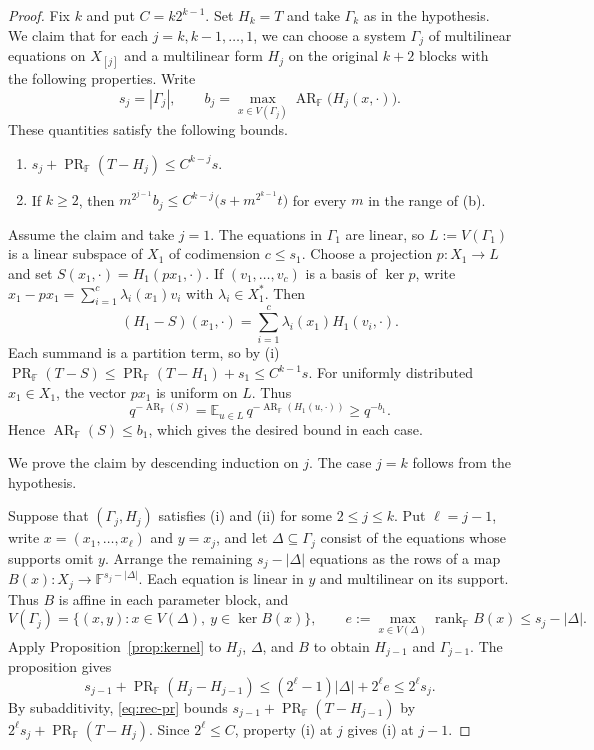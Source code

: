 \documentclass[11pt,reqno]{amsart}
\theoremstyle{plain}
\theoremstyle{definition}
\newcommand{\F}{\mathbb F}
\newcommand{\E}{\mathbb E}
\DeclareMathOperator{\arank}{AR}
\DeclareMathOperator{\prank}{PR}
\DeclareMathOperator{\rk}{rank}
\begin{document}
\begin{proof}
Fix $k$ and put $C=k2^{k-1}$. Set $H_k=T$ and take $\Gamma_k$ as in
the hypothesis. We claim that for each $j=k,k-1,\ldots,1$, we can choose a system
$\Gamma_j$ of multilinear equations on $X_{[j]}$ and a multilinear
form $H_j$ on the original $k+2$ blocks with the following properties.
Write
\[
 s_j=|\Gamma_j|,\qquad
 b_j=\max_{x\in V(\Gamma_j)}\arank_{\F}\bigl(H_j(x,\cdot)\bigr).
\]
These quantities satisfy the following bounds.
\begin{enumerate}
\item[\textup{(i)}] $s_j+\prank_{\F}(T-H_j)\leq C^{k-j}s$.
\item[\textup{(ii)}] If $k\geq2$, then
$m^{2^{j-1}}b_j\leq C^{k-j}\bigl(s+m^{2^{k-1}}t\bigr)$ for every $m$ in
the range of \textup{(b)}.
\end{enumerate}

Assume the claim and take $j=1$.
The equations in $\Gamma_1$ are linear, so $L:=V(\Gamma_1)$
is a linear subspace of $X_1$ of codimension $c\leq s_1$. Choose a projection $p\colon X_1\to L$
and set $S(x_1,\cdot)=H_1(px_1,\cdot)$. If $(v_1,\ldots,v_c)$ is
a basis of $\ker p$, write $x_1-px_1=\sum_{i=1}^c\lambda_i(x_1)v_i$
with $\lambda_i\in X_1^*$. Then
\[
 (H_1-S)(x_1,\cdot)=\sum_{i=1}^c\lambda_i(x_1)H_1(v_i,\cdot).
\]
Each summand is a partition term, so by \textup{(i)}
$\prank_{\F}(T-S)\leq\prank_{\F}(T-H_1)+s_1\leq C^{k-1}s$.
For uniformly distributed $x_1\in X_1$, the vector $px_1$ is uniform on $L$. Thus
\[
q^{-\arank_{\F}(S)}
=\E_{u\in L}\,q^{-\arank_{\F}(H_1(u,\cdot))}
\geq q^{-b_1}.
\]
Hence $\arank_{\F}(S)\leq b_1$, which gives the desired bound in each case.

We prove the claim by descending induction on $j$. The case $j=k$ follows from the hypothesis.

Suppose that $(\Gamma_j,H_j)$ satisfies
\textup{(i)} and \textup{(ii)} for some $2\leq j\leq k$. Put $\ell=j-1$, write
$x=(x_1,\ldots,x_\ell)$ and $y=x_j$, and let $\Delta\subseteq\Gamma_j$
consist of the equations whose supports omit $y$. Arrange the remaining
$s_j-|\Delta|$ equations as the rows of a map
$B(x)\colon X_j\to\F^{s_j-|\Delta|}$. Each equation is linear in $y$ and multilinear on its support. Thus $B$ is affine in each parameter block, and
\[
 V(\Gamma_j)=\{(x,y):x\in V(\Delta),\ y\in\ker B(x)\},
 \qquad e:=\max_{x\in V(\Delta)}\rk_{\F} B(x)\leq s_j-|\Delta|.
\]
Apply Proposition~\ref{prop:kernel} to $H_j$, $\Delta$, and $B$ to obtain $H_{j-1}$ and $\Gamma_{j-1}$. The proposition gives
\begin{equation}\label{eq:rec-pr}
 s_{j-1}+\prank_{\F}(H_j-H_{j-1})
 \leq (2^\ell-1)|\Delta|+2^\ell e\leq 2^\ell s_j .
\end{equation}
By subadditivity, \eqref{eq:rec-pr} bounds
$s_{j-1}+\prank_{\F}(T-H_{j-1})$ by
$2^\ell s_j+\prank_{\F}(T-H_j)$. Since $2^\ell\leq C$, property
\textup{(i)} at $j$ gives \textup{(i)} at $j-1$.


\end{proof}
\end{document}
